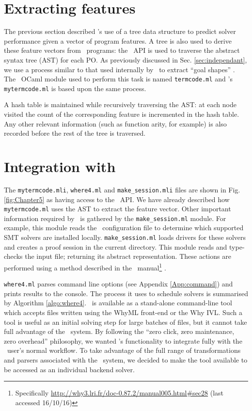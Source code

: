 \section{Extracting features}

The previous section described \where's use of a tree data structure to predict solver performance given a vector of program features.
A tree is also used to derive these feature vectors from \why~programs: the \why~API is used to traverse the abstract syntax tree (AST) for each PO.
As previously discussed in Sec. \ref{sec:independant}, we use a process similar to that used internally by \why~to extract ``goal shapes'' \cite{why:preserving}.
The \why~OCaml module used to perform this task is named \texttt{termcode.ml} and \where's \texttt{mytermcode.ml} is based upon the same process.

A hash table is maintained while recursively traversing the AST: at each node visited the count of the corresponding feature is incremented in the hash table. 
Any other relevant information (such as function arity, for example) is also recorded before the rest of the tree is traversed. 

\section{Integration with \why}
\label{sec:why3-integration}

\sloppypar
The \texttt{mytermcode.mli}, \texttt{where4.ml} and \texttt{make\_session.mli} files are shown in Fig. \ref{fig:Chapter5} as having access to the \why~API. 
We have already described how \texttt{mytermcode.ml} uses the AST to extract the feature vector.
Other important information required by \why~is gathered by the \texttt{make\_session.ml} module.
For example, this module reads the \why~configuration file to determine which supported SMT solvers are installed locally.
\texttt{make\_session.ml} loads drivers for these solvers and creates a proof session in the current directory. This module reads and type-checks the input file; returning its abstract representation.
These actions are performed using a method described in the \why~manual\footnote{Specifically \url{http://why3.lri.fr/doc-0.87.2/manual005.html\#sec28} (last accessed 16/10/16)} \cite{why:manual}.

\texttt{where4.ml} parses command line options (see Appendix \ref{App:command}) and prints results to the console.
The process it uses to schedule solvers is summarised by Algorithm \ref{algo:where4}.
\where~is available as a stand-alone command-line tool which accepts files written using the WhyML front-end or the Why IVL.
Such a tool is useful as an initial solving step for large batches of files, but it cannot take full advantage of the \why~system.
By following the ``zero click, zero maintenance, zero overhead'' philosophy, we wanted \where's functionality to integrate fully with the \why~user's normal workflow.
To take advantage of the full range of transformations and parsers associated with the \why~system, we decided to make the tool available to be accessed as an individual backend solver.
   
